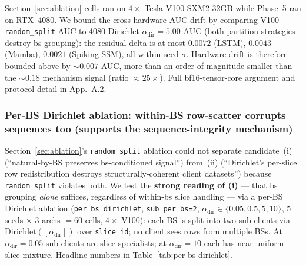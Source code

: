 \documentclass[journal]{IEEEtran}
\newcommand{\alphadir}{\ensuremath{\alpha_{\mathrm{dir}}}}
\begin{document}
Section~\ref{sec:ablation} cells ran on $4 \times$ Tesla V100-SXM2-32GB while Phase~5 ran on RTX~4080. We bound the cross-hardware AUC drift by comparing V100 \lstinline|random_split| AUC to 4080 Dirichlet $\alphadir = 5.00$ AUC (both partition strategies destroy bs grouping): the residual delta is at most $0.0072$ (LSTM), $0.0043$ (Mamba), $0.0021$ (Spiking-SSM), all within seed $\sigma$. Hardware drift is therefore bounded above by $\sim 0.007$ AUC, more than an order of magnitude smaller than the $\sim 0.18$ mechanism signal (ratio $\approx 25\times$). Full bf16-tensor-core argument and protocol detail in App.~A.2.

\subsubsection{Per-BS Dirichlet ablation: within-BS row-scatter corrupts sequences too (supports the sequence-integrity mechanism)}\label{sec:per-bs-ablation}

Section~\ref{sec:ablation}'s \lstinline|random_split| ablation could not separate candidate~(i) (``natural-by-BS preserves bs-conditioned signal'') from~(ii) (``Dirichlet's per-slice row redistribution destroys structurally-coherent client datasets'') because \lstinline|random_split| violates both. We test the \textbf{strong reading of (i)} --- that bs grouping \emph{alone} suffices, regardless of within-bs slice handling --- via a per-BS Dirichlet ablation (\lstinline|per_bs_dirichlet|, \lstinline|sub_per_bs=2|, $\alphadir \in \{0.05, 0.5, 5, 10\}$, 5 seeds $\times$ 3 archs $= 60$ cells, $4 \times$ V100): each BS is split into two sub-clients via $\mathrm{Dirichlet}([\alphadir])$ over \lstinline|slice_id|; no client sees rows from multiple BSs. At $\alphadir = 0.05$ sub-clients are slice-specialists; at $\alphadir = 10$ each has near-uniform slice mixture. Headline numbers in Table~\ref{tab:per-bs-dirichlet}.
\end{document}
